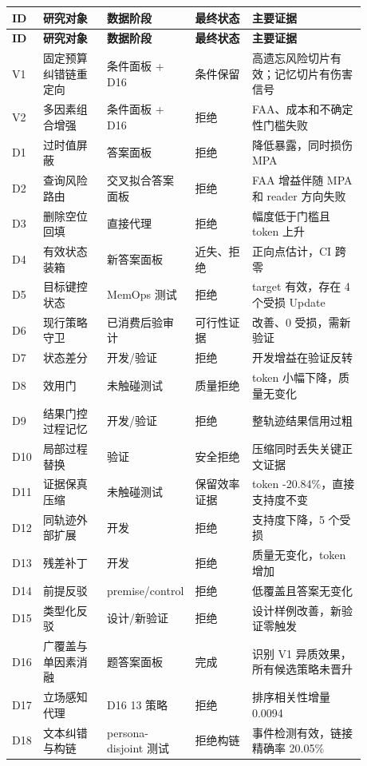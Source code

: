 \begingroup
\footnotesize
\setlength{\tabcolsep}{3pt}
\renewcommand{\arraystretch}{1.16}
\begin{longtable}{@{}>{\raggedright\arraybackslash}p{0.080\linewidth}>{\raggedright\arraybackslash}p{0.180\linewidth}>{\raggedright\arraybackslash}p{0.140\linewidth}>{\raggedright\arraybackslash}p{0.160\linewidth}>{\raggedright\arraybackslash}p{0.320\linewidth}@{}}
\toprule
\textbf{ID} & \textbf{研究对象} & \textbf{数据阶段} & \textbf{最终状态} & \textbf{主要证据} \\
\midrule
\endfirsthead
\toprule
\textbf{ID} & \textbf{研究对象} & \textbf{数据阶段} & \textbf{最终状态} & \textbf{主要证据} \\
\midrule
\endhead
\bottomrule
\endfoot
V1 & 固定预算纠错链重定向 & 条件面板 + D16 & 条件保留 & 高遗忘风险切片有效；记忆切片有伤害信号 \\
V2 & 多因素组合增强 & 条件面板 + D16 & 拒绝 & FAA、成本和不确定性门槛失败 \\
D1 & 过时值屏蔽 & 答案面板 & 拒绝 & 降低暴露，同时损伤 MPA \\
D2 & 查询风险路由 & 交叉拟合答案面板 & 拒绝 & FAA 增益伴随 MPA 和 reader 方向失败 \\
D3 & 删除空位回填 & 直接代理 & 拒绝 & 幅度低于门槛且 token 上升 \\
D4 & 有效状态装箱 & 新答案面板 & 近失、拒绝 & 正向点估计，CI 跨零 \\
D5 & 目标键控状态 & MemOps 测试 & 拒绝 & target 有效，存在 4 个受损 Update \\
D6 & 现行策略守卫 & 已消费后验审计 & 可行性证据 & 28 改善、0 受损，需新验证 \\
D7 & 状态差分 & 开发/验证 & 拒绝 & 开发增益在验证反转 \\
D8 & 效用门 & 未触碰测试 & 质量拒绝 & token 小幅下降，质量无变化 \\
D9 & 结果门控过程记忆 & 开发/验证 & 拒绝 & 整轨迹结果信用过粗 \\
D10 & 局部过程替换 & 验证 & 安全拒绝 & 压缩同时丢失关键正文证据 \\
D11 & 证据保真压缩 & 未触碰测试 & 保留效率证据 & token -20.84\%，直接支持度不变 \\
D12 & 同轨迹外部扩展 & 开发 & 拒绝 & 支持度下降，5 个受损 \\
D13 & 残差补丁 & 开发 & 拒绝 & 质量无变化，token 增加 \\
D14 & 前提反驳 & premise/control & 拒绝 & 低覆盖且答案无变化 \\
D15 & 类型化反驳 & 设计/新验证 & 拒绝 & 设计样例改善，新验证零触发 \\
D16 & 广覆盖与单因素消融 & 200 题答案面板 & 完成 & 识别 V1 异质效果，所有候选策略未晋升 \\
D17 & 立场感知代理 & D16 13 策略 & 拒绝 & 排序相关性增量 0.0094 \\
D18 & 文本纠错与构链 & persona-disjoint 测试 & 拒绝构链 & 事件检测有效，链接精确率 20.05\% \\
\end{longtable}
\endgroup

